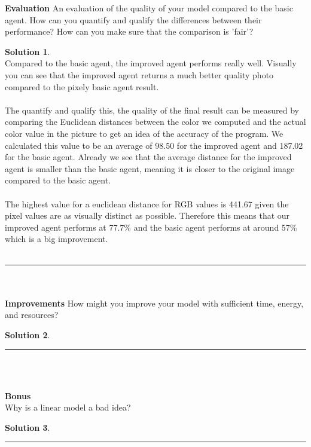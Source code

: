 \documentclass{article}
\theoremstyle{definition}
\def\fline{\rule{0.75\linewidth}{0.5pt}}
\newcommand{\finishline}{\vspace{-15pt}\begin{center}\fline\end{center}}
\newtheorem*{solution*}{Solution}
\newenvironment{solution}{\begin{solution*}}{{\finishline} \end{solution*}}
\begin{document}
    \textbf{Evaluation}
        An evaluation of the quality of your model compared to the basic agent. How can you quantify and qualify the differences between their performance? How can you make sure that the comparison is 'fair'? 
        \begin{solution} \hfill \\
        Compared to the basic agent, the improved agent performs really well. Visually you can see that the improved agent returns a much better quality photo compared to the pixely basic agent result.\\\\
        The quantify and qualify this, the quality of the final result can be measured by comparing the Euclidean distances between the color we computed and the actual color value in the picture to get an idea of the accuracy of the program. We calculated this value to be an average of 98.50 for the improved agent and 187.02 for the basic agent. Already we see that the average distance for the improved agent is smaller than the basic agent, meaning it is closer to the original image compared to the basic agent. \\\\
        The highest value for a euclidean distance for RGB values is 441.67 given the pixel values are as visually distinct as possible. Therefore this means that our improved agent performs at 77.7\% and the basic agent performs at around 57\% which is a big improvement.\\\\
    
        \end{solution}\\\\
        
    \textbf{Improvements}
        How might you improve your model with sufficient time, energy, and resources?
        \begin{solution} \hfill \\
    
        \end{solution}\\\\
\smallskip

\textbf{\Large Bonus} \\
    Why is a linear model a bad idea? 
    \begin{solution} \hfill \\
    
    \end{solution}\\
    
\end{document}
